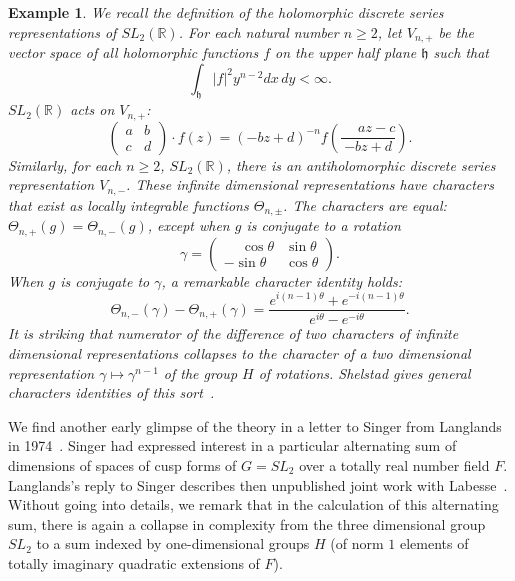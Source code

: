\documentclass[brochure,english,12pt]{bourbaki}
\theoremstyle{plain}
\newtheorem{example}[equation]{Example}
\newcommand{\ring}[1]{\mathbb{#1}}
\begin{document}
\begin{example}\label{ex:sl2}  We recall the definition of the holomorphic discrete series representations
  of $SL_2(\ring{R})$.  For each natural number $n\ge 2$, let
  $V_{n,+}$ be the vector space of all holomorphic functions $f$ on
  the upper half plane ${\mathfrak h}$ such that
\[
\int_{\mathfrak h} |f|^2 y^{n-2} dx\, dy < \infty.
\]
$SL_2(\ring{R})$ acts on $V_{n,+}$:
\[
\begin{pmatrix} a & b \\ c & d \end{pmatrix} \cdot f(z) = 
(-b z + d ) ^{-n} f (\frac{\phantom{-}a z - c}{-b z + d}).
\]
Similarly, for each $n\ge 2$, $SL_2(\ring{R})$, there is an antiholomorphic discrete series
representation  $V_{n,-}$.  These infinite
dimensional representations have characters that exist as locally integrable
functions $\Theta_{n,\pm}$.  The characters are equal:
$\Theta_{n,+}(g)=\Theta_{n,-}(g)$, except when $g$ is conjugate to a
rotation
\[
\gamma = 
\begin{pmatrix} \phantom{-}\cos\theta & \sin\theta \\ -\sin\theta & \cos\theta\end{pmatrix}.
\] 
When $g$ is conjugate to $\gamma$, a remarkable character identity holds:
\begin{equation}\label{eqn:discrete-series}
\Theta_{n,-}(\gamma) - \Theta_{n,+}(\gamma) = 
\frac{e^{i (n-1) \theta} + e^{- i (n-1) \theta}}{e^{i\theta}-e^{-i\theta}}.
\end{equation}
It is striking that numerator of the difference of two characters of
infinite dimensional representations collapses to the character of a two
dimensional representation $\gamma\mapsto \gamma^{n-1}$ of the group $H$ of
rotations.  Shelstad gives general characters identities of this
sort~\cite{Shelstad:OI}. %
\end{example}

We find another early glimpse of the theory in a letter to Singer from
Langlands in 1974~\cite{L:singer:1974}.  Singer had expressed interest
in a particular alternating sum of dimensions of spaces of cusp forms
of $G=SL_2$ over a totally real number field $F$.  Langlands's reply
to Singer describes then unpublished joint work with
Labesse~\cite{LL:1979}.  Without going into details, we remark that in
the calculation of  this alternating sum, there is again a collapse in
complexity from the three dimensional group $SL_2$ to a sum indexed by
one-dimensional groups $H$ (of norm $1$ elements of totally imaginary
quadratic extensions of $F$).
\end{document}
